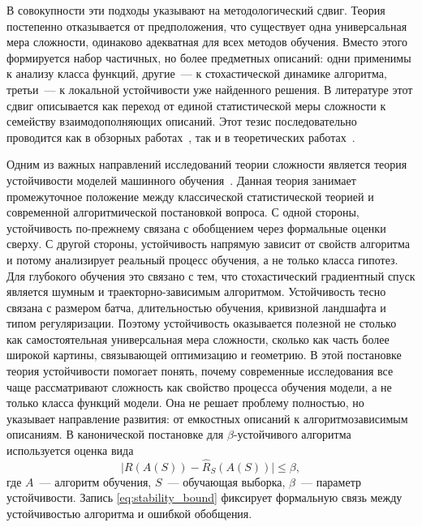 В совокупности эти подходы указывают на методологический сдвиг.
Теория постепенно отказывается от предположения, что существует одна универсальная мера сложности, одинаково адекватная для всех методов обучения.
Вместо этого формируется набор частичных, но более предметных описаний: одни применимы к анализу класса функций, другие~--- к стохастической динамике алгоритма, третьи~--- к локальной устойчивости уже найденного решения.
В литературе этот сдвиг описывается как переход от единой статистической меры сложности к семейству взаимодополняющих описаний. Этот тезис последовательно проводится как в обзорных работах~\cite{hu2021complexitysurvey,recent2020theory,belkin2021overview}, так и в теоретических работах~\cite{explaining2021thesis,kawaguchi2017generalization,poggio2020theoretical,poggio2017nonoverfitting}.

Одним из важных направлений исследований теории сложности является теория устойчивости моделей машинного обучения~\cite{bousquet2002stability,hardt2016train}.
Данная теория занимает промежуточное положение между классической статистической теорией и современной алгоритмической постановкой вопроса.
С одной стороны, устойчивость по-прежнему связана с обобщением через формальные оценки сверху.
С другой стороны, устойчивость напрямую зависит от свойств алгоритма и потому анализирует реальный процесс обучения, а не только класса гипотез.
Для глубокого обучения это связано с тем, что стохастический градиентный спуск является шумным и траекторно-зависимым алгоритмом.
Устойчивость тесно связана с размером батча, длительностью обучения, кривизной ландшафта и типом регуляризации.
Поэтому устойчивость оказывается полезной не столько как самостоятельная универсальная мера сложности, сколько как часть более широкой картины, связывающей оптимизацию и геометрию.
В этой постановке теория устойчивости помогает понять, почему современные исследования все чаще рассматривают сложность как свойство процесса обучения модели, а не только класса функций модели.
Она не решает проблему полностью, но указывает направление развития: от емкостных описаний к алгоритмозависимым описаниям.
В канонической постановке для $\beta$-устойчивого алгоритма используется оценка вида
\begin{equation}
\bigl|R(A(S))-\hat R_S(A(S))\bigr|\le \beta,
\label{eq:stability_bound}
\end{equation}
где $A$~--- алгоритм обучения, $S$~--- обучающая выборка, $\beta$~--- параметр устойчивости. Запись \eqref{eq:stability_bound} фиксирует формальную связь между устойчивостью алгоритма и ошибкой обобщения.

